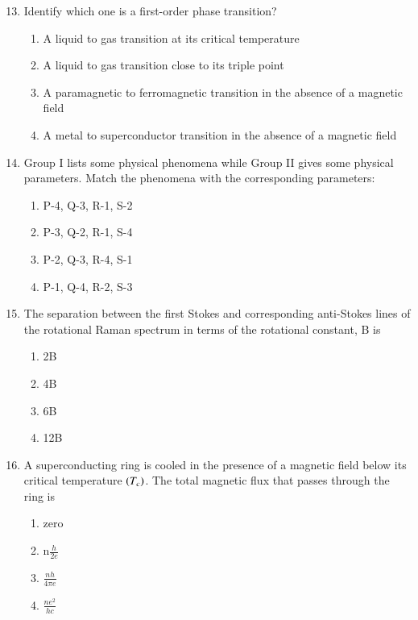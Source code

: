 \documentclass[journal,9pt,onecolumn]{IEEEtran}
\begin{document}
\begin{enumerate}

\setcounter{enumi}{12}
\item Identify which one is a first-order phase transition?
\begin{enumerate}
     \item A liquid to gas transition at its critical temperature
    \item A liquid to gas transition close to its triple point
    \item A paramagnetic to ferromagnetic transition in the absence of a magnetic field
    \item A metal to superconductor transition in the absence of a magnetic field
\end{enumerate}

\item Group I lists some physical phenomena while Group II gives some physical parameters. Match the phenomena with the corresponding parameters:
\begin{table}[h!]
 	\centering
 	
 	\label{tab:Ph-2009}
 \end{table}
\begin{multicols}{2}
\begin{enumerate}
      \item P-4, Q-3, R-1, S-2
    \item P-3, Q-2, R-1, S-4
    \item P-2, Q-3, R-4, S-1
    \item P-1, Q-4, R-2, S-3
\end{enumerate}
\end{multicols}


\item  The separation between the first Stokes and corresponding anti-Stokes lines of the rotational Raman spectrum in terms of the rotational constant, B is
\begin{multicols}{4}
\begin{enumerate}
    \item 2B
    \item 4B
    \item 6B
    \item 12B
    \end{enumerate}
\end{multicols}


\item   A superconducting ring is cooled in the presence of a magnetic field below its critical temperature $\left(T_c\right)$. The total magnetic flux that passes through the ring is
\begin{multicols}{4}    
\begin{enumerate}
    \item zero
    \item n$\frac{h}{2e}$
    \item $\frac{nh}{4\pi e}$
    \item $\frac{ne^2}{hc}$
\end{enumerate}
\end{multicols}



\end{enumerate}
\end{document}
